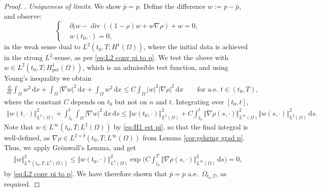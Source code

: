 \documentclass[11pt,a4paper,reqno]{amsart}
\theoremstyle{remark}
\theoremstyle{definition}
\numberwithin{equation}{section}
\newcommand{\per}{\mathrm{per}}
\DeclareMathOperator{\dv}{div}
\renewcommand{\d}{\, \mathrm{d} }
\newcommand{\der}{\mathrm{d}}
\begin{document}
\begin{proof}
. \textit{Uniqueness of limits}: We show $\bar{p} = p$. Define the difference $w := p - \bar{p}$, and observe: 
\begin{equation}\label{eq:difference of galerkin}
    \left\lbrace\begin{aligned}
        & \partial_t w - \dv((1-\rho)w + w \nabla \rho) + w = 0, \\ 
        & w(t_0,\cdot) = 0, 
    \end{aligned}\right.
\end{equation}
in the weak sense dual to $L^2(t_0,T;H^1(\Omega))$, where the initial data is achieved in the strong $L^2$-sense, as per \eqref{eq:L2 conv pi to p}. We test the above with $w \in L^2(t_0,T;H^1_\per(\Omega))$, which is an admissible test function, and using Young's inequality we obtain 
\begin{equation*}
    \begin{aligned}
        \frac{\der}{\der t}\int_\Omega w^2 \d x + \int_\Omega |\nabla w|^2 \d x + \int_\Omega w^2 \d x \leq C \int_\Omega |w|^2 |\nabla \rho|^2 \d x \qquad \text{for a.e.~}t \in (t_0,T), 
    \end{aligned}
\end{equation*}
where the constant $C$ depends on $t_0$ but not on $n$ and $t$. Integrating over $[t_0,t]$, 
\begin{equation}\label{eq:needed for sup wn argument sec 6}
    \begin{aligned}
        \Vert w(t,\cdot)\Vert^2_{L^2(\Omega)} \!+\!\! \int_{t_0}^t \!\int_\Omega |\nabla w|^2 \d x \d s \leq {\Vert w(t_0,\cdot)\Vert^2_{L^2(\Omega)}} \!+\! C \int_{t_0}^t \!\! \! \Vert \nabla \rho(s,\cdot) \Vert^2_{L^\infty(\Omega)} \Vert w(s,\cdot)\Vert^2_{L^2(\Omega)} \d s. 
    \end{aligned}
\end{equation}
Note that $w \in L^\infty(t_0,T;L^2(\Omega))$ by \eqref{eq:H1 est pi}, so that the final integral is well-defined, as $\nabla \rho \in L^{2+\delta}(t_0,T;L^\infty(\Omega))$ from Lemma \ref{cor:gehring grad p}. Thus, we apply Gr\"onwall's Lemma, and get 
\begin{equation*}
    \begin{aligned}
        \Vert w \Vert^2_{L^\infty(t_0,T;L^2(\Omega))} \leq \Vert w(t_0,\cdot)\Vert^2_{L^2(\Omega)}\exp\bigg( C \int_{t_0}^T \Vert \nabla \rho(s,\cdot) \Vert^2_{L^\infty(\Omega)} \d s \bigg) = 0, 
    \end{aligned}
\end{equation*}
by \eqref{eq:L2 conv pi to p}. We have therefore shown that $\bar{p} = p$ a.e.~$\Omega_{t_0,T}$, as required. 


\end{proof}
\end{document}

